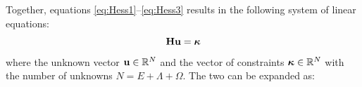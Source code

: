 Together, equations \eqref{eq:Hess1}--\eqref{eq:Hess3} results in the following system of linear equations:
\begin{equation} \label{eq:HessianEqn}
  \mathbf{H} \mathbf{u} = \boldsymbol{\kappa}
\end{equation}
where the unknown vector $\mathbf{u} \in \mathbb{R}^N$ and the vector of constraints $\boldsymbol{\kappa} \in \mathbb{R}^N$ with the number of unknowns $N = E + \Lambda + \Omega$. The two can be expanded as:
